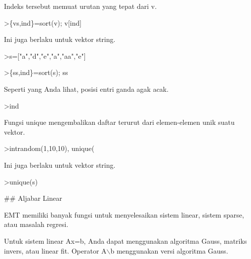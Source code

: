 \documentclass[a4paper,10pt]{article}
\begin{document}
\begin{eulernotebook}
\begin{euleroutput}
  Indeks tersebut memuat urutan yang tepat dari v.
  
\end{euleroutput}
\begin{eulerprompt}
>\{vs,ind\}=sort(v); v[ind]
\end{eulerprompt}
\begin{euleroutput}
  
  Ini juga berlaku untuk vektor string.
  
\end{euleroutput}
\begin{eulerprompt}
>s=["a","d","e","a","aa","e"]
\end{eulerprompt}
\begin{euleroutput}
  
\end{euleroutput}
\begin{eulerprompt}
>\{ss,ind\}=sort(s); ss
\end{eulerprompt}
\begin{euleroutput}
  
  Seperti yang Anda lihat, posisi entri ganda agak acak.
  
\end{euleroutput}
\begin{eulerprompt}
>ind
\end{eulerprompt}
\begin{euleroutput}
  
  Fungsi unique mengembalikan daftar terurut dari elemen-elemen unik suatu vektor.
  
\end{euleroutput}
\begin{eulerprompt}
>intrandom(1,10,10), unique(%
\end{eulerprompt}
\begin{euleroutput}
  
  Ini juga berlaku untuk vektor string.
  
\end{euleroutput}
\begin{eulerprompt}
>unique(s)
\end{eulerprompt}
\begin{euleroutput}
  
  ## Aljabar Linear
  
  EMT memiliki banyak fungsi untuk menyelesaikan sistem linear, sistem sparse, atau masalah regresi.
  
  Untuk sistem linear Ax=b, Anda dapat menggunakan algoritma Gauss, matriks invers, atau linear fit. Operator A\(\backslash\)b menggunakan versi algoritma Gauss.
  

\end{euleroutput}
\end{eulernotebook}
\end{document}
